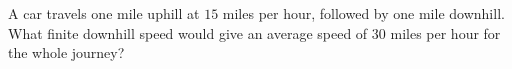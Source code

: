 A car travels one mile uphill at $15$ miles per hour, followed by one mile downhill. What finite downhill speed would give an average speed of $30$ miles per hour for the whole journey?
